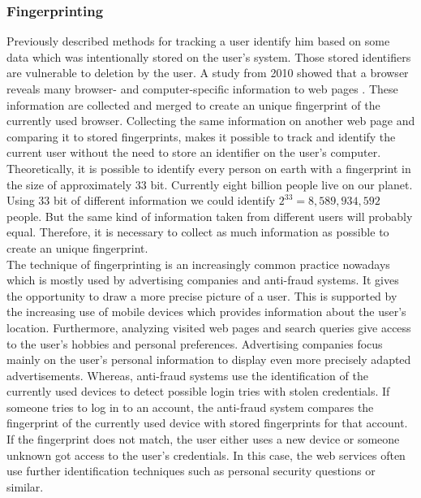 		\subsubsection{Fingerprinting}
			
			Previously described methods for tracking a user identify him based on some data which was intentionally stored on the user's system. Those stored identifiers are vulnerable to deletion by the user. A study from 2010 showed that a browser reveals many browser- and computer-specific information to web pages \cite{Eckersley:2010:UYW:1881151.1881152}. These information are collected and merged to create an unique fingerprint of the currently used browser. Collecting the same information on another web page and comparing it to stored fingerprints, makes it possible to track and identify the current user without the need to store an identifier on the user's computer. Theoretically, it is possible to identify every person on earth with a fingerprint in the size of approximately 33 bit. Currently eight billion people live on our planet. Using 33 bit of different information we could identify $2^{33}=8,589,934,592$ people. But the same kind of information taken from different users will probably equal. Therefore, it is necessary to collect as much information as possible to create an unique fingerprint. \\
			
			The technique of fingerprinting is an increasingly common practice nowadays which is mostly used by advertising companies and anti-fraud systems. It gives the opportunity to draw a more precise picture of a user. This is supported by the increasing use of mobile devices which provides information about the user's location. Furthermore, analyzing visited web pages and search queries give access to the user's hobbies and personal preferences. Advertising companies focus mainly on the user's personal information to display even more precisely adapted advertisements. Whereas, anti-fraud systems use the identification of the currently used devices to detect possible login tries with stolen credentials. If someone tries to log in to an account, the anti-fraud system compares the fingerprint of the currently used device with stored fingerprints for that account. If the fingerprint does not match, the user either uses a new device or someone unknown got access to the user's credentials. In this case, the web services often use further identification techniques such as personal security questions or similar. \\
			
